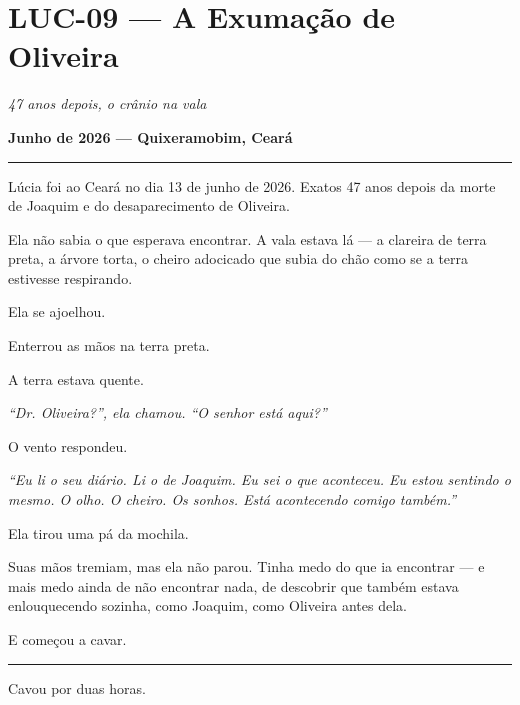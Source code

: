 \section*{\textbf{LUC-09} --- A Exumação de Oliveira}

\noindent \textit{47 anos depois, o crânio na vala}

\noindent \textbf{Junho de 2026 --- Quixeramobim, Ceará}

\vspace{0.5em}\noindent\rule{\textwidth}{0.5pt}\vspace{0.5em}

\noindent Lúcia foi ao Ceará no dia 13 de junho de 2026. Exatos 47 anos depois da morte de Joaquim e do desaparecimento de Oliveira.

\noindent Ela não sabia o que esperava encontrar. A vala estava lá --- a clareira de terra preta, a árvore torta, o cheiro adocicado que subia do chão como se a terra estivesse respirando.

\noindent Ela se ajoelhou.

\noindent Enterrou as mãos na terra preta.

\noindent A terra estava quente.

\noindent \textit{\textquotedblleft{}Dr. Oliveira?\textquotedblright{}\textit{, ela chamou. }\textquotedblleft{}O senhor está aqui?\textquotedblright{}}

\noindent O vento respondeu.

\noindent \textit{\textquotedblleft{}Eu li o seu diário. Li o de Joaquim. Eu sei o que aconteceu. Eu estou sentindo o mesmo. O olho. O cheiro. Os sonhos. Está acontecendo comigo também.\textquotedblright{}}

\noindent Ela tirou uma pá da mochila.

\noindent Suas mãos tremiam, mas ela não parou. Tinha medo do que ia encontrar --- e mais medo ainda de não encontrar nada, de descobrir que também estava enlouquecendo sozinha, como Joaquim, como Oliveira antes dela.

\noindent E começou a cavar.

\vspace{0.5em}\noindent\rule{\textwidth}{0.5pt}\vspace{0.5em}

\noindent Cavou por duas horas.

